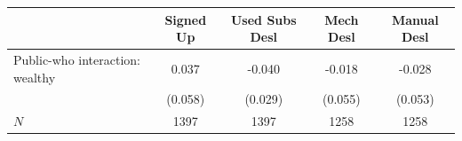 \begin{tabular}{lcccc}
\hline\hline
 & Signed Up & Used Subs Desl & Mech Desl & Manual Desl \\
\hline
Public-who interaction: wealthy & 0.037 & -0.040 & -0.018 & -0.028 \\
 & (0.058) & (0.029) & (0.055) & (0.053) \\
\hline
$N$ & 1397 & 1397 & 1258 & 1258 \\
\hline\hline
\end{tabular}
